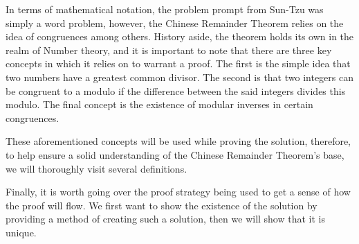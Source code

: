 \documentclass[12pt,a4paper,reqno,parskip=full]{amsart}
\numberwithin{equation}{section}
\theoremstyle{plain}
\theoremstyle{definition}
\begin{document}
In terms of mathematical notation, the problem prompt from Sun-Tzu was simply a word problem, however, the Chinese Remainder Theorem relies on the idea of congruences among others. History aside, the theorem holds its own in the realm of Number theory, and it is important to note that there are three key concepts in which it relies on to warrant a proof. The first is the simple idea that two numbers have a greatest common divisor. The second is that two integers can be congruent to a modulo if the difference between the said integers divides this modulo. The final concept is the existence of modular inverses in certain congruences. 

These aforementioned concepts will be used while proving the solution, therefore, to help ensure a solid understanding of the Chinese Remainder Theorem's base, we will thoroughly visit several definitions. 

Finally, it is worth going over the proof strategy being used to get a sense of how the proof will flow. We first want to show the existence of the solution by providing a method of creating such a solution, then we will show that it is unique.






\end{document}
